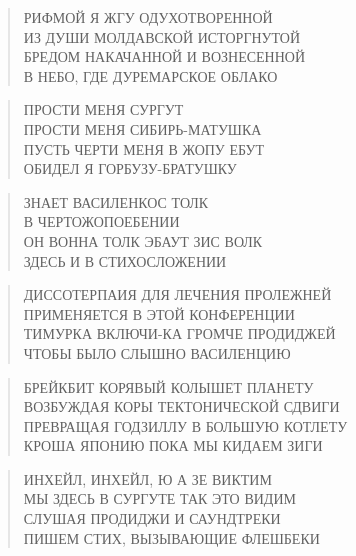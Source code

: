 \poemtitle{***}
\begin{verse}
РИФМОЙ Я ЖГУ ОДУХОТВОРЕННОЙ\\
ИЗ ДУШИ МОЛДАВСКОЙ ИСТОРГНУТОЙ\\
БРЕДОМ НАКАЧАННОЙ И ВОЗНЕСЕННОЙ\\
В НЕБО, ГДЕ ДУРЕМАРСКОЕ ОБЛАКО
\end{verse}

\poemtitle{***}
\begin{verse}
ПРОСТИ МЕНЯ СУРГУТ\\
ПРОСТИ МЕНЯ СИБИРЬ-МАТУШКА\\
ПУСТЬ ЧЕРТИ МЕНЯ В ЖОПУ ЕБУТ\\
ОБИДЕЛ Я ГОРБУЗУ-БРАТУШКУ
\end{verse}

\poemtitle{***}
\begin{verse}
ЗНАЕТ ВАСИЛЕНКОС ТОЛК\\
В ЧЕРТОЖОПОЕБЕНИИ\\
ОН ВОННА ТОЛК ЭБАУТ ЗИС ВОЛК\\
ЗДЕСЬ И В СТИХОСЛОЖЕНИИ
\end{verse}

\poemtitle{***}
\begin{verse}
ДИССОТЕРПАИЯ ДЛЯ ЛЕЧЕНИЯ ПРОЛЕЖНЕЙ\\
ПРИМЕНЯЕТСЯ В ЭТОЙ КОНФЕРЕНЦИИ\\
ТИМУРКА ВКЛЮЧИ-КА ГРОМЧЕ ПРОДИДЖЕЙ\\
ЧТОБЫ БЫЛО СЛЫШНО ВАСИЛЕНЦИЮ
\end{verse}

\poemtitle{***}
\begin{verse}
БРЕЙКБИТ КОРЯВЫЙ КОЛЫШЕТ ПЛАНЕТУ\\
ВОЗБУЖДАЯ КОРЫ ТЕКТОНИЧЕСКОЙ СДВИГИ\\
ПРЕВРАЩАЯ ГОДЗИЛЛУ В БОЛЬШУЮ КОТЛЕТУ\\
КРОША ЯПОНИЮ ПОКА МЫ КИДАЕМ ЗИГИ
\end{verse}

\poemtitle{***}
\begin{verse}
ИНХЕЙЛ, ИНХЕЙЛ, Ю А ЗЕ ВИКТИМ\\
МЫ ЗДЕСЬ В СУРГУТЕ ТАК ЭТО ВИДИМ\\
СЛУШАЯ ПРОДИДЖИ И САУНДТРЕКИ\\
ПИШЕМ СТИХ, ВЫЗЫВАЮЩИЕ ФЛЕШБЕКИ
\end{verse}

